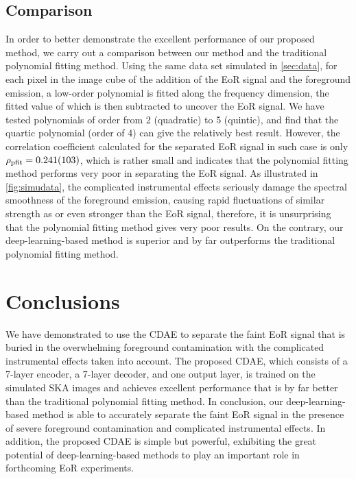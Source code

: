 \documentclass[letters,a4paper,fleqn,usenatbib]{mnras}
\newcommand{\R}[1]{\mathrm{#1}}
\begin{document}
\subsection{Comparison}
\label{sec:comparison}

In order to better demonstrate the excellent performance of our proposed
method, we carry out a comparison between our method and the traditional
polynomial fitting method.
Using the same data set simulated in \autoref{sec:data}, for each pixel
in the image cube of the addition of the EoR signal and the foreground
emission, a low-order polynomial is fitted along the frequency
dimension, the fitted value of which is then subtracted to uncover the
EoR signal.
We have tested polynomials of order from 2 (quadratic) to 5 (quintic),
and find that the quartic polynomial (order of 4) can give the
relatively best result.
However, the correlation coefficient calculated for the separated EoR
signal in such case is only $\rho_{\R{pfit}} = \num{0.241 +- 0.103}$,
which is rather small and indicates that the polynomial fitting method
performs very poor in separating the EoR signal.
As illustrated in \autoref{fig:simudata}, the complicated instrumental
effects seriously damage the spectral smoothness of the foreground
emission, causing rapid fluctuations of similar strength as or even
stronger than the EoR signal, therefore, it is unsurprising that the
polynomial fitting method gives very poor results.
On the contrary, our deep-learning-based method is superior and
by far outperforms the traditional polynomial fitting method.


\section{Conclusions}
\label{sec:conclusions}

We have demonstrated to use the CDAE to separate the faint EoR signal
that is buried in the overwhelming foreground contamination with the
complicated instrumental effects taken into account.
The proposed CDAE, which consists of a 7-layer encoder, a 7-layer
decoder, and one output layer, is trained on the simulated SKA images
and achieves excellent performance that is by far better than the
traditional polynomial fitting method.
In conclusion, our deep-learning-based method is able to accurately
separate the faint EoR signal in the presence of severe foreground
contamination and complicated instrumental effects.
In addition, the proposed CDAE is simple but powerful, exhibiting the
great potential of deep-learning-based methods to play an important
role in forthcoming EoR experiments.
\end{document}
